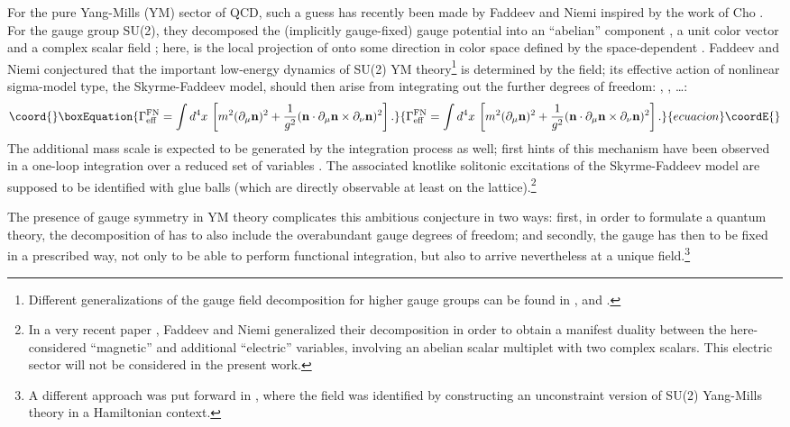 \documentclass[a4paper,12pt]{article}
\begin{document}
For the pure Yang-Mills (YM) sector of QCD, such a guess has recently
been made by Faddeev and Niemi \cite{Faddeev:1999eq} inspired by the
work of Cho \cite{Cho:1980nv}. For the gauge group SU(2), they
decomposed the (implicitly gauge-fixed) gauge potential
\myHighlight{$\mA_\mu$}\coordHE{} into an ``abelian'' component \coordHE{}, a unit color vector
\myHighlight{$\mn$}\coordHE{} and a complex scalar field \myHighlight{$\varphi$}\coordHE{}; here, \coordHE{} is the local
projection of \myHighlight{$\mA_\mu$}\coordHE{} onto some direction in color space defined by
the space-dependent \myHighlight{$\mn$}\coordHE{}. Faddeev and Niemi conjectured that the
important low-energy dynamics of SU(2) YM theory\footnote{Different
  generalizations of the gauge field decomposition for higher gauge
  groups can be found in \cite{Periwal:1998pc}, \cite{Faddeev:1999yz}
  and \cite{Shabanov:1999xy}.} is determined by the
\myHighlight{$\mn$}\coordHE{} field; its effective action of nonlinear sigma-model type,
the Skyrme-Faddeev model, should then arise from integrating out the
further degrees of freedom: \coordHE{}, \myHighlight{$\varphi$}\coordHE{}, \dots:
\begin{equation}\coord{}\boxEquation{
\Geff^{\text{FN}}= \int d^4x\, \left[ m^2 (\partial_\mu \mn)^2 +
  \frac{1}{g^2} (\mn\cdot
  \partial_\mu\mn\times\partial_\nu\mn)^2\right]. \label{1}
}{
\Geff^{\text{FN}}= \int d^4x\, \left[ m^2 (\partial_\mu \mn)^2 +
  \frac{1}{g^2} (\mn\cdot
  \partial_\mu\mn\times\partial_\nu\mn)^2\right]. }{ecuacion}\coordE{}\end{equation}
The additional mass scale \coordHE{} is expected to be generated by the
integration process as well; first hints of this mechanism have been
observed in a one-loop integration over a reduced set of variables
\cite{Langmann:1999nn,Cho:1999wp}. The associated knotlike solitonic
excitations of the Skyrme-Faddeev model are supposed to be identified
with glue balls (which are directly observable at least on the
lattice).\footnote{In a very recent paper \cite{Faddeev:2001dd},
  Faddeev and Niemi generalized their decomposition in order to obtain
  a manifest duality between the here-considered ``magnetic'' and
  additional ``electric'' variables, involving an abelian scalar
  multiplet with two complex scalars. This electric sector will not be
  considered in the present work.}

The presence of gauge symmetry in YM theory complicates this ambitious
conjecture in two ways: first, in order to formulate a quantum theory,
the decomposition of \myHighlight{$\mA_\mu$}\coordHE{} has to also include the overabundant
gauge degrees of freedom; and secondly, the gauge has then to be fixed
in a prescribed way, not only to be able to perform functional
integration, but also to arrive nevertheless at a unique \myHighlight{$\mn$}\coordHE{}
field.\footnote{A different approach was put forward in
  \cite{Khvedelidze:1999hm}, where the \myHighlight{$\mn$}\coordHE{} field was identified by
  constructing an unconstraint version of SU(2) Yang-Mills theory in a
  Hamiltonian context.}
\end{document}

